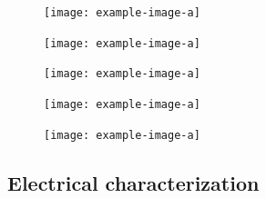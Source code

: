 \documentclass[a4paper, table]{article}
\begin{document}
\begin{figure}[h]
\centering
\begin{minipage}{0.28\textwidth}         %
  \centering
  \texttt{[image: example-image-a]}
  \label{fig: style 2 image f}
\end{minipage}
\end{figure}

\vspace{-5mm}
\begin{figure}[h]
\centering
\begin{minipage}{0.28\textwidth}
  \centering
  \texttt{[image: example-image-a]}
  \label{fig:defect liftoff}
\end{minipage}
\hfill
\begin{minipage}{0.28\textwidth}         %
  \centering
  \texttt{[image: example-image-a]}
  \label{fig: style 2 image d}
\end{minipage}
\hfill
\begin{minipage}{0.28\textwidth}
  \centering
  \texttt{[image: example-image-a]}
  \label{fig: style 2 image e}
\end{minipage}
\end{figure}

\vspace{-5mm}

\begin{figure}[h]
\centering
\begin{minipage}{0.28\textwidth}
  \centering
  \texttt{[image: example-image-a]}
  \label{fig: style 2 image g}
\end{minipage}
\end{figure}


\subsection*{Electrical characterization}
\end{document}
